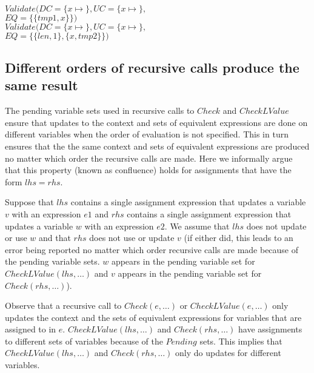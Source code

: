 \begin{small}
\begin{tabbing}
\>\\
\>\>$Validate(DC = \{x \mapsto$$\},
                   \mathit{UC} = \{x\mapsto $$\},$\\
\>\>\>\>\>\>$EQ = \{\{tmp1, x\}\})$\\
\>\>$Validate(DC = \{x \mapsto$$\}, 
                   \mathit{UC} = \{x\mapsto $$\},$\\
\>\>\>\>\>\>$EQ = \{\{len, 1\}, \{x, tmp2\}\})$\\
\end{tabbing}
\end{small}

\subsection{Different orders of recursive calls produce the same result}

The pending variable sets used in recursive calls to $Check$ and $CheckLValue$
ensure that updates to the context and sets of equivalent expressions are done on different variables when
the order of evaluation is not specified.  This in turn ensures that the the same context and sets of equivalent expressions
are produced no matter which order the recursive calls are made.   Here we informally argue 
that this property (known as confluence) holds for assignments that have the form $lhs = rhs$.

Suppose that $lhs$
contains a single assignment expression that updates a variable $v$ with an expression $e1$ and 
$rhs$ contains a single assignment expression that updates  a variable $w$ with an expression $e2$.
We assume that $lhs$ does not update or use $w$ and that $rhs$ does not use or update $v$
(if either did, this leads to an error being reported no matter which order recursive calls are
made because of the pending variable sets.  $w$ appears in the pending variable set for
$CheckLValue(lhs,\ldots)$ and $v$ appears in the pending variable set for $Check(rhs, \ldots)$).

Observe that a recursive call to $Check(e, \ldots)$ or $CheckLValue(e, \ldots)$ only updates the context
and the sets of equivalent expressions for variables that are assigned to in $e$.   $CheckLValue(lhs,\ldots)$ and
$Check(rhs, \ldots)$ have assignments to different sets of variables because of the $Pending$ sets.  This
implies that $CheckLValue(lhs,\ldots)$ and $Check(rhs, \ldots)$ only do updates for different variables.

